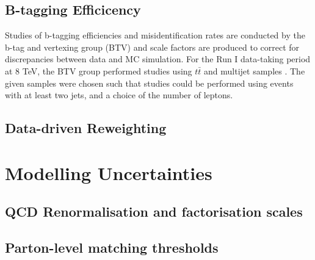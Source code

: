 


\subsection{B-tagging Efficicency} \label{subsec-BTagEfficiency}


Studies of b-tagging efficiencies and misidentification rates are conducted by the b-tag and vertexing group (BTV) and scale factors are produced to correct for discrepancies between data and MC simulation. For the Run I data-taking period at 8 TeV, the BTV group performed studies using $t\bar{t}$ and multijet samples \cite{BTAGPAS}. The given samples were chosen such that studies could be performed using events with at least two jets, and a choice of the number of leptons. %

\subsection{Data-driven Reweighting} \label{subsec-DataDriverReweightingUncertainties}

\section{Modelling Uncertainties} \label{sec-ModellingUncertainties}

\subsection{QCD Renormalisation and factorisation scales}

\subsection{Parton-level matching thresholds}


